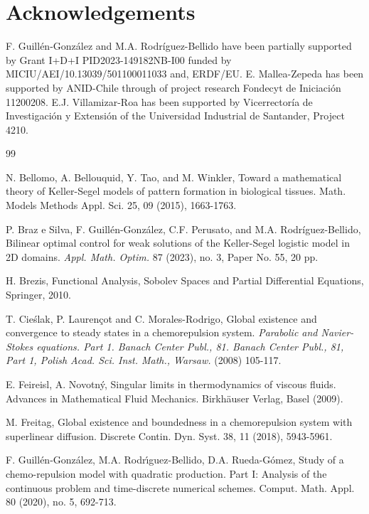 \documentclass[11pt,reqno]{amsart}%
\numberwithin{equation}{section}
\begin{document}
{\section*{Acknowledgements}
F. Guill\'en-Gonz\'alez and M.A. Rodr\'iguez-Bellido have been partially supported by Grant  I+D+I PID2023-149182NB-I00 funded by MICIU/AEI/10.13039/501100011033 and, 
ERDF/EU.  
E. Mallea-Zepeda has been supported by ANID-Chile through of project research
Fondecyt de Iniciaci\'on 11200208. E.J. Villamizar-Roa has been supported by Vicerrector\'ia de Investigaci\'on y Extensi\'on of the Universidad Industrial de Santander, Project 4210.

\begin{thebibliography}{99}      

 N. Bellomo, A. Bellouquid, Y. Tao, and M. Winkler,  Toward a mathematical theory of Keller-Segel models of pattern formation in biological tissues. Math. Models Methods Appl. Sci. 25, 09 (2015), 1663-1763.

P. Braz e Silva, F. Guill\'en-Gonz\'alez, C.F. Perusato, and M.A. Rodr\'iguez-Bellido, Bilinear optimal control for weak solutions of the Keller-Segel logistic model in 2D domains. 
{\it Appl. Math. Optim.} 87 (2023), no. 3, Paper No. 55, 20 pp.

H. Brezis, Functional Analysis, Sobolev Spaces and Partial Differential Equations, Springer, 2010.



 T. Cie\'{s}lak, P. Lauren\c{c}ot and C. Morales-Rodrigo, Global existence and convergence to steady states in a chemorepulsion system.
{\it Parabolic and Navier-Stokes equations. Part 1. Banach Center Publ., 81. Banach Center Publ., 81, Part 1, Polish Acad. Sci. Inst. Math., Warsaw.} (2008) 105-117.


 E. Feireisl, A. Novotn\'y, Singular limits in thermodynamics of viscous fluids.
Advances in Mathematical Fluid Mechanics. 
Birkh\"auser Verlag, Basel (2009).

 M. Freitag, Global existence and boundedness in a chemorepulsion system with superlinear diffusion. Discrete Contin. Dyn. Syst. 38, 11 (2018), 5943-5961.

F. Guill\'en-Gonz\'alez, M.A. Rodr\'{\i}guez-Bellido, D.A. Rueda-G\'omez, Study of a chemo-repulsion model with quadratic production. Part I: Analysis of the continuous problem and time-discrete numerical schemes. Comput. Math. Appl. 80 (2020), no. 5, 692-713.


\end{thebibliography}}
\end{document}
